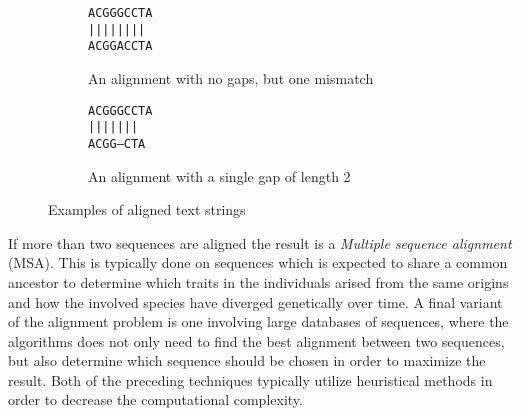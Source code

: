\documentclass[thesis.tex]{subfiles}
\begin{document}
\par\noindent
\begin{wrapfigure}{l}{0.3\textwidth}
  \begin{mdframed}
    \begin{subfigure}[t]{\textwidth}
      \begin{mdframed}
        \begin{center}
          \texttt{ACGGGCCTA}\\
          \texttt{||||\space||||}\\
          \texttt{ACGGACCTA}
        \end{center}
      \end{mdframed}
      \caption{An alignment with no gaps, but one mismatch}
    \end{subfigure}
    \begin{subfigure}[b]{\textwidth}
      \begin{mdframed}
        \begin{center}
          \texttt{ACGGGCCTA}\\
          \texttt{||||\space\space|||}\\
          \texttt{ACGG---CTA}
        \end{center}
      \end{mdframed}
      \caption{An alignment with a single gap of length 2}
    \end{subfigure}
  \end{mdframed}
  \caption{Examples of aligned text strings}
  \label{fig:alignments}
\end{wrapfigure}
If more than two sequences are aligned the result is a \textit{Multiple sequence alignment} (MSA). This is typically done on sequences which is expected to share a common ancestor to determine which traits in the individuals arised from the same origins and how the involved species have diverged genetically over time. A final variant of the alignment problem is one involving large databases of sequences, where the algorithms does not only need to find the best alignment between two sequences, but also determine which sequence should be chosen in order to maximize the result. Both of the preceding techniques typically utilize heuristical methods in order to decrease the computational complexity.
\end{document}
